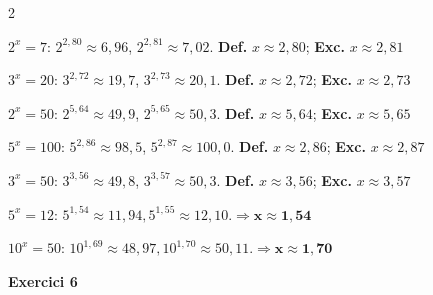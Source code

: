 \documentclass[12pt,a4paper]{article}
\begin{document}
\begin{multicols}{2}
\begin{exercicis}
    \item $2^x=7$: $2^{2{,}80}\approx 6{,}96$, $2^{2{,}81}\approx 7{,}02$. \quad \textbf{Def.} $x\approx2{,}80$; \textbf{Exc.} $x\approx2{,}81$
    \item $3^x=20$: $3^{2{,}72}\approx19{,}7$, $3^{2{,}73}\approx20{,}1$. \quad \textbf{Def.} $x\approx2{,}72$; \textbf{Exc.} $x\approx2{,}73$
    \item $2^x=50$: $2^{5{,}64}\approx49{,}9$, $2^{5{,}65}\approx50{,}3$. \quad \textbf{Def.} $x\approx5{,}64$; \textbf{Exc.} $x\approx5{,}65$
    \item $5^x=100$: $5^{2{,}86}\approx98{,}5$, $5^{2{,}87}\approx100{,}0$. \quad \textbf{Def.} $x\approx2{,}86$; \textbf{Exc.} $x\approx2{,}87$
    \item $3^x=50$: $3^{3{,}56}\approx49{,}8$, $3^{3{,}57}\approx50{,}3$. \quad \textbf{Def.} $x\approx3{,}56$; \textbf{Exc.} $x\approx3{,}57$
    \item $5^x=12$: $5^{1{,}54} \approx 11{,}94, 5^{1{,}55} \approx 12{,}10. \Rightarrow \boldsymbol{x \approx 1{,}54}$
    \item $10^x=50$: $10^{1{,}69} \approx 48{,}97, 10^{1{,}70} \approx 50{,}11. \Rightarrow \boldsymbol{x \approx 1{,}70}$
\end{exercicis}
\end{multicols}

\newpage

\vspace{0.8cm}
\noindent\textbf{Exercici 6}
\end{document}

